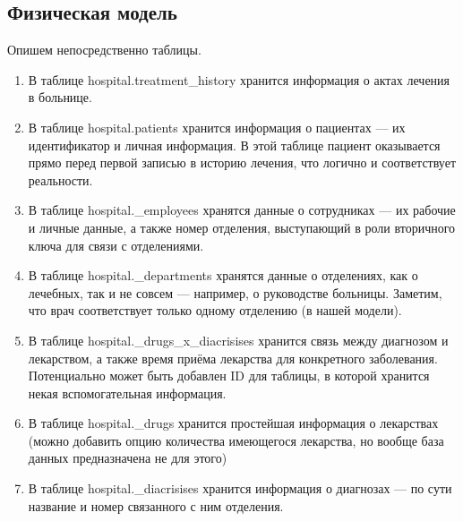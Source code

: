 \documentclass[12pt]{article}
\begin{document}
	\subsection{Физическая модель}
	\begin{center}
	\end{center}
	Опишем непосредственно таблицы.
	
	\begin{enumerate}
		\item В таблице hospital.treatment\_history хранится информация о актах лечения в больнице.
		\item В таблице hospital.patients хранится информация о пациентах --- их идентификатор и личная информация. В этой таблице пациент оказывается прямо перед первой записью в историю лечения, что логично и соответствует реальности.
		\item В таблице hospital.\_employees хранятся данные о сотрудниках --- их рабочие и личные данные, а также номер отделения, выступающий в роли вторичного ключа для связи с отделениями.
		\item В таблице hospital.\_departments хранятся данные о отделениях, как о лечебных, так и не совсем --- например, о руководстве больницы. Заметим, что врач соответствует только одному отделению (в нашей модели). 
		\item В таблице hospital.\_drugs\_x\_diacrisises хранится связь между диагнозом и лекарством, а также время приёма лекарства для конкретного заболевания. Потенциально может быть добавлен ID для таблицы, в которой хранится некая вспомогательная информация.
		\item В таблице hospital.\_drugs хранится простейшая информация о лекарствах (можно добавить опцию количества имеющегося лекарства, но вообще база данных предназначена не для этого)
		\item В таблице hospital.\_diacrisises хранится информация о диагнозах --- по сути название и номер связанного с ним отделения.
	\end{enumerate}
	
\end{document}
